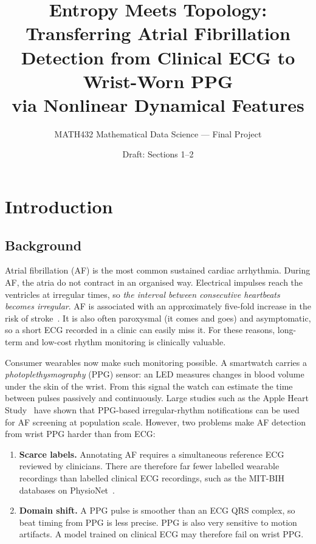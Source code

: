 \documentclass[11pt]{article}
\title{Entropy Meets Topology:\\[2pt]
\large Transferring Atrial Fibrillation Detection from Clinical ECG to Wrist-Worn PPG\\
via Nonlinear Dynamical Features}
\author{MATH432 Mathematical Data Science --- Final Project}
\date{Draft: Sections 1--2}
\begin{document}
\maketitle

\section{Introduction}

\subsection{Background}

Atrial fibrillation (AF) is the most common sustained cardiac arrhythmia.
During AF, the atria do not contract in an organised way. Electrical impulses
reach the ventricles at irregular times, so \emph{the interval between
consecutive heartbeats becomes irregular}. AF is associated with an
approximately five-fold increase in the risk of stroke~\cite{wolf1991}. It is
also often paroxysmal (it comes and goes) and asymptomatic, so a short ECG
recorded in a clinic can easily miss it. For these reasons, long-term and
low-cost rhythm monitoring is clinically valuable.

Consumer wearables now make such monitoring possible. A smartwatch carries a
\emph{photoplethysmography} (PPG) sensor: an LED measures changes in blood
volume under the skin of the wrist. From this signal the watch can estimate
the time between pulses passively and continuously. Large studies such as the
Apple Heart Study~\cite{perez2019} have shown that PPG-based irregular-rhythm
notifications can be used for AF screening at population scale. However, two
problems make AF detection from wrist PPG harder than from ECG:
\begin{enumerate}
  \item \textbf{Scarce labels.} Annotating AF requires a simultaneous
  reference ECG reviewed by clinicians. There are therefore far fewer
  labelled wearable recordings than labelled clinical ECG recordings, such as
  the MIT-BIH databases on PhysioNet~\cite{physionet}.
  \item \textbf{Domain shift.} A PPG pulse is smoother than an ECG QRS
  complex, so beat timing from PPG is less precise. PPG is also very
  sensitive to motion artifacts. A model trained on clinical ECG may
  therefore fail on wrist PPG.
\end{enumerate}
\end{document}
